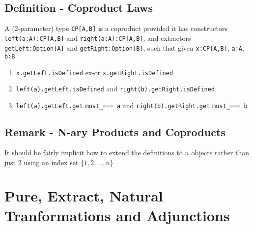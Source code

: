 \documentclass[9pt]{article} %
\begin{document}
\subsection{Definition - Coproduct Laws}

A (2-parameter) type \texttt{CP[A,B]} is a coproduct provided it has constructors \texttt{left(a:A):CP[A,B]} and \texttt{right(a:A):CP[A,B]}, and extractors \texttt{getLeft:Option[A]} and \texttt{getRight:Option[B]}, such that given \texttt{x:CP[A,B]}, \texttt{a:A}, \texttt{b:B}

\begin{enumerate}
    \item \texttt{x.getLeft.isDefined} ex-or \texttt{x.getRight.isDefined}
    \item \texttt{left(a).getLeft.isDefined} and \texttt{right(b).getRight.isDefined}
    \item \texttt{left(a).getLeft.get} \texttt{must\_=== a}  and \texttt{right(b).getRight.get} \texttt{must\_=== b}
\end{enumerate}

\subsection{Remark - N-ary Products and Coproducts}

It should be fairly implicit how to extend the definitions to $n$ objects rather than just $2$ using an index set $\{1, 2, ..., n\}$

\section{Pure, Extract, Natural Tranformations and Adjunctions}
\end{document}
